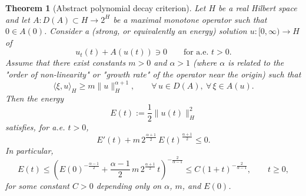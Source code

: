 \documentclass[11pt,reqno]{amsart}
\newtheorem{theorem}{Theorem}[section]
\theoremstyle{remark}
\begin{document}
\begin{theorem}[Abstract polynomial decay criterion]
Let $H$ be a real Hilbert space and let $A:D(A)\subset H\to 2^H$ be a maximal monotone operator such that
$0\in A(0)$. Consider a (strong, or equivalently an energy) solution $u:[0,\infty)\to H$ of
\begin{equation}
u_t(t)+A(u(t))\ni 0
\qquad \text{for a.e. } t>0.
\end{equation}
Assume that there exist constants $m>0$ and $\alpha>1$ (where $\alpha$ is related to the "order of non-linearity" or "growth rate" of the operator near the origin) such that
\begin{equation}\label{coercive-abstract}
\langle \xi,u\rangle_H \ge m \|u\|_H^{\alpha+1},
\qquad \forall\, u\in D(A),\ \forall\, \xi\in A(u).
\end{equation}
Then the energy
\begin{equation}
E(t):=\frac12\|u(t)\|_H^2
\end{equation}
satisfies, for a.e. $t>0$,
\begin{equation}\label{DI-energy}
E'(t)+m\,2^{\frac{\alpha+1}{2}}\,E(t)^{\frac{\alpha+1}{2}}\le 0.
\end{equation}
In particular,
\begin{equation}\label{poly-decay}
E(t)\le
\left(
E(0)^{-\frac{\alpha-1}{2}}
+\frac{\alpha-1}{2}\,m\,2^{\frac{\alpha+1}{2}}\, t
\right)^{-\frac{2}{\alpha-1}}
\le C(1+t)^{-\frac{2}{\alpha-1}},
\qquad t\ge 0,
\end{equation}
for some constant $C>0$ depending only on $\alpha$, $m$, and $E(0)$.
\end{theorem}
\end{document}

